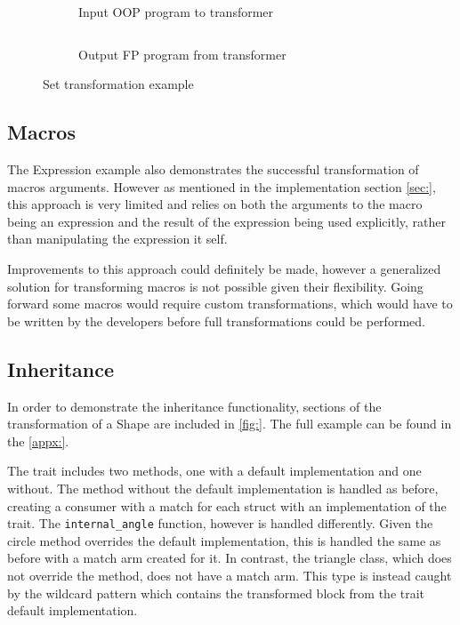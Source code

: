 \documentclass[ oneside,%
                    author={James Elgar},
                    degree={MEng},
                     title={Bidirectional transformer between functional and \\ object-oriented programming in Rust},
                  subtitle={}]{dissertation}
\newcommand{\rust}[1]{\texttt{#1}}
\newcommand{\codefile}[2]{\inputminted[xleftmargin=20pt,linenos, breaklines]{#1}{#2}}
\newcommand{\rustfile}[1]{\codefile{rust}{../#1.rs}}
\newcommand{\rustexample}[1]{\rustfile{examples/src/#1}}
\newcommand{\rustoutput}[1]{\rustfile{outputs/src/#1}}
\begin{document}

\begin{figure}
\centering
\begin{subfigure}{.5\textwidth}
    \rustexample{exp/oop}
    \caption{Input OOP program to transformer}
    \label{fig:trans-set-ex-input}
\end{subfigure}%
\begin{subfigure}{.5\textwidth}
    \rustoutput{exp/oop}
    \caption{Output FP program from transformer}
    \label{fig:trans-set-ex-output}
\end{subfigure}
\caption{Set transformation example}
\label{fig:trans-set-ex}
\end{figure}

\subsection{Macros}

The Expression example also demonstrates the successful transformation of macros arguments. However as mentioned in the implementation section \autoref{sec:}, this approach is very limited and relies on both the arguments to the macro being an expression and the result of the expression being used explicitly, rather than manipulating the expression it self.

Improvements to this approach could definitely be made, however a generalized solution for transforming macros is not possible given their flexibility. Going forward some macros would require custom transformations, which would have to be written by the developers before full transformations could be performed. 

\subsection{Inheritance}

In order to demonstrate the inheritance functionality, sections of the transformation of a Shape are included in \autoref{fig:}. The full example can be found in the \autoref{appx:}.

The trait includes two methods, one with a default implementation and one without. The method without the default implementation is handled as before, creating a consumer with a match for each struct with an implementation of the trait. The \rust{internal_angle} function, however is handled differently. Given the circle method overrides the default implementation, this is handled the same as before with a match arm created for it. In contrast, the triangle class, which does not override the method, does not have a match arm. This type is instead caught by the wildcard pattern which contains the transformed block from the trait default implementation.   
\end{document}
